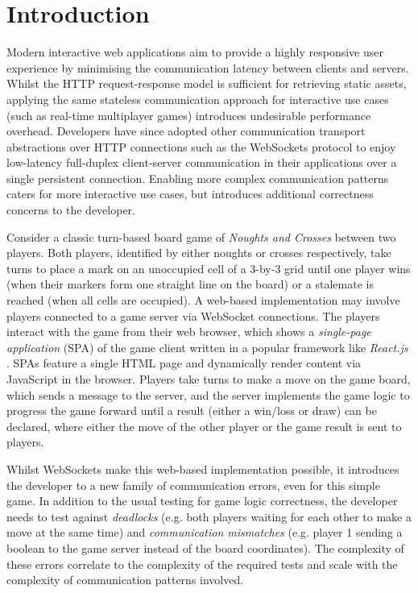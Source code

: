 \section{Introduction}

Modern interactive web applications aim to provide a highly responsive user
experience by minimising the communication latency between clients and servers.
Whilst the HTTP request-response model is sufficient for retrieving static
assets, applying the same stateless communication approach for interactive use
cases (such as real-time multiplayer games) introduces undesirable performance
overhead.
Developers have since adopted other communication transport abstractions over
HTTP connections such as the WebSockets protocol \cite{WebSocketRFC} to enjoy
low-latency full-duplex client-server communication in their applications over
a single persistent connection.
Enabling more complex communication patterns caters for more interactive use
cases, but introduces additional correctness concerns to the developer.

Consider a classic turn-based board game of \textit{Noughts and Crosses}
between two players.
Both players, identified by either noughts or crosses respectively, take
turns to place a mark on an unoccupied cell of a 3-by-3 grid until one player
wins (when their markers form one straight line on the board) or a stalemate is
reached (when all cells are occupied).
A web-based implementation may involve players connected to a game server via
WebSocket connections.
The players interact with the game from their web browser, which shows a
\textit{single-page application} (SPA) of the game client written in a popular
framework like \textit{React.js} \cite{React}.
SPAs feature a single HTML page and dynamically render content via JavaScript
in the browser.
Players take turns to make a move on the game board, which sends a message to
the server, and the server implements the game logic to progress the game
forward until a result (either a win/loss or draw) can be declared, where
either the move of the other player or the game result is sent to players.

Whilst WebSockets make this web-based implementation possible, it introduces
the developer to a new family of communication errors, even for this simple
game.
In addition to the usual testing for game logic correctness, the
developer needs to test against \textit{deadlocks} (e.g. both players waiting
for each other to make a move at the same time) and \textit{communication
 mismatches} (e.g. player 1 sending a boolean to the game server instead of
the board coordinates).
The complexity of these errors correlate to the
complexity of the required tests and scale with the complexity of
communication patterns involved.

